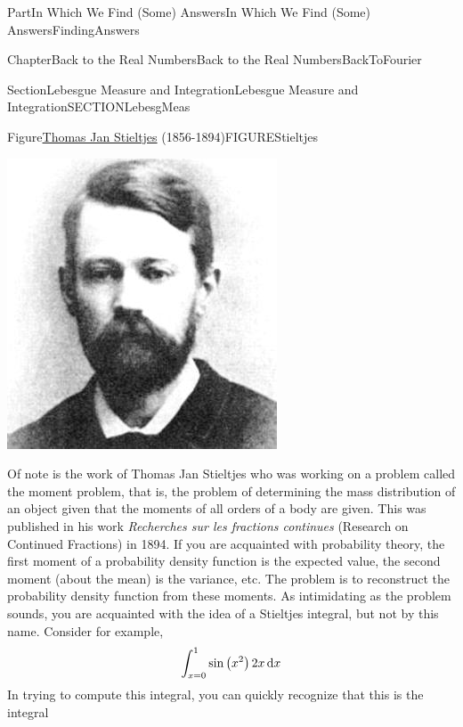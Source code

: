 \documentclass[oneside,10pt,]{book}
\numberwithin{equation}{part}
\newcommand{\dx}[1]{\,{\rm d}#1}
\begin{document}
\begin{partptx}{Part}{In Which We Find (Some) Answers}{}{In Which We Find (Some) Answers}{}{}{FindingAnswers}
\begin{chapterptx}{Chapter}{Back to the Real Numbers}{}{Back to the Real Numbers}{}{}{BackToFourier}
\begin{sectionptx}{Section}{Lebesgue Measure and Integration}{}{Lebesgue Measure and Integration}{}{}{SECTIONLebesgMeas}
\begin{figureptx}{Figure}{\href{https://mathshistory.st-andrews.ac.uk/Biographies/Stieltjes/}{Thomas Jan Stieltjes}\protect\footnotemark{} (1856-1894)}{FIGUREStieltjes}{}
\begin{image}{0.35}{0.3}{0.35}{}%
\includegraphics[width=\linewidth]{external/images/Stieltjes.jpg}
\end{image}%
\tcblower
\end{figureptx}%
%
Of note is the work of Thomas Jan Stieltjes who was working on a problem called the moment problem, that is, the problem of determining the mass distribution of an object given that the moments of all orders of a body are given.  This was published in his work \textit{Recherches sur les fractions continues} (Research on Continued Fractions) in 1894.  If you are acquainted with probability theory, the first moment of a probability density function is the expected value, the second moment (about the mean) is the variance, etc.  The problem is to reconstruct the probability density function from these moments.  As intimidating as the problem sounds, you are acquainted with the idea of a Stieltjes integral, but not by this name.  Consider for example,%
\begin{equation*}
\int^1_{x=0}{\sin\left(x^2\right)2x\dx{x}}
\end{equation*}
In trying to compute this integral, you can quickly recognize that this is the integral%

\end{sectionptx}
\end{chapterptx}
\end{partptx}
\end{document}
